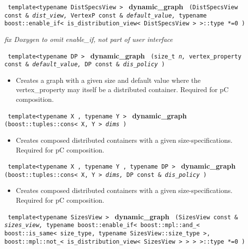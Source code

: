 \noindent
\texttt{%
template<typename DistSpecsView >
}
\newline
\textbf{dynamic\_graph}%
\texttt{%
(DistSpecsView const \&
\textit{dist\_view,}%
VertexP const \&
\textit{default\_value,}%
typename boost::enable\_if< is\_distribution\_view< DistSpecsView > >::type *=0
)
}

\vspace{0.4cm} \emph{fix Doxygen to omit enable\_if, not part of user interface}
 
\noindent
\texttt{%
template<typename DP >
}
\newline
\textbf{dynamic\_graph}%
\texttt{%
(size\_t 
\textit{n,}%
vertex\_property const \&
\textit{default\_value,}%
DP const \&
\textit{dis\_policy}%
)
}

\begin{itemize}
\item
Creates a graph with a given size and default value where the vertex\_property may itself be a distributed container. Required for pC composition. 
\end{itemize}
 
\noindent
\texttt{%
template<typename X , typename Y >
}
\newline
\textbf{dynamic\_graph}%
\texttt{%
(boost::tuples::cons< X, Y > 
\textit{dims}%
)
}

\begin{itemize}
\item
Creates composed distributed containers with a given size-specifications. Required for pC composition. 
\end{itemize}
 
\noindent
\texttt{%
template<typename X , typename Y , typename DP >
}
\newline
\textbf{dynamic\_graph}%
\texttt{%
(boost::tuples::cons< X, Y > 
\textit{dims,}%
DP const \&
\textit{dis\_policy}%
)
}

\begin{itemize}
\item
Creates composed distributed containers with a given size-specifications. Required for pC composition. 
\end{itemize}
 
\noindent
\texttt{%
template<typename SizesView >
}
\newline
\textbf{dynamic\_graph}%
\texttt{%
(SizesView const \&
\textit{sizes\_view,}%
typename boost::enable\_if< boost::mpl::and\_< boost::is\_same< size\_type,
 typename SizesView::size\_type >, boost::mpl::not\_< is\_distribution\_view< SizesView > > > >::type *=0
)
}

